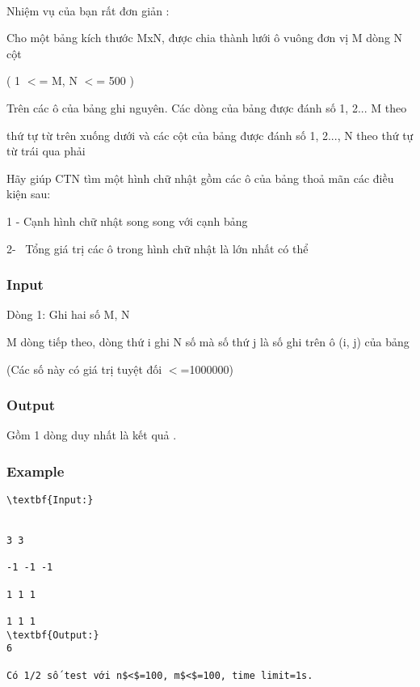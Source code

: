 

 

Nhiệm vụ của bạn rất đơn giản :

Cho một bảng kích thước MxN, được chia thành lưới ô vuông đơn vị M dòng N cột

( 1 $<$= M, N $<$= 500 )

Trên các ô của bảng ghi nguyên. Các dòng của bảng được đánh số 1, 2... M theo

thứ tự từ trên xuống dưới và các cột của bảng được đánh số 1, 2..., N theo thứ tự từ trái qua phải

Hãy giúp CTN tìm một hình chữ nhật gồm các ô của bảng thoả mãn các điều kiện sau:

1 - Cạnh hình chữ nhật song song với cạnh bảng

2-  Tổng giá trị các ô trong hình chữ nhật là lớn nhất có thể

\subsubsection{Input}

Dòng 1: Ghi hai số M, N

M dòng tiếp theo, dòng thứ i ghi N số mà số thứ j là số ghi trên ô (i, j) của bảng

(Các số này có giá trị tuyệt đối $<$=1000000)

\subsubsection{Output}

Gồm 1 dòng duy nhất là kết quả .

\subsubsection{Example}
\begin{verbatim}
\textbf{Input:}


3 3

-1 -1 -1

1 1 1 

1 1 1
\textbf{Output:}
6

Có 1/2 số test với n$<$=100, m$<$=100, time limit=1s.\end{verbatim}
